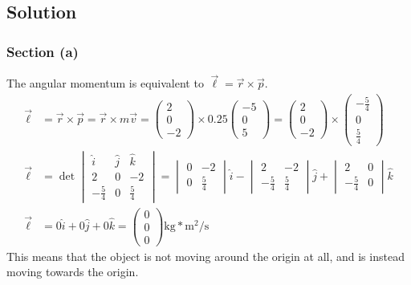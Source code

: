 \documentclass[12pt]{article}
\begin{document}
\subsection{Solution}
\subsubsection{Section (a)}
The angular momentum is equivalent to \(\vec{\ell} = \vec{r}\times\vec{p}\).
\begin{align}
    \vec{\ell}  &=  \vec{r} \times \vec{p}
        =   \vec{r} \times m\vec{v}
        =   \begin{pmatrix}2\\0\\-2\end{pmatrix} \times 0.25\begin{pmatrix}-5\\0\\5\end{pmatrix}
        =   \begin{pmatrix}2\\0\\-2\end{pmatrix} \times \begin{pmatrix}-\frac{5}{4}\\0\\\frac{5}{4}\end{pmatrix}\\
    \vec{\ell}  &=  \det\begin{vmatrix}
                            \hat{i} &\hat{j}&\hat{k}\\
                            2       &0      &-2     \\
                            -\frac{5}{4}&0  &\frac{5}{4}
                        \end{vmatrix}
        =   \begin{vmatrix}0&-2\\0&\frac{5}{4}\end{vmatrix}\hat{i} -
            \begin{vmatrix}2&-2\\-\frac{5}{4}&\frac{5}{4}\end{vmatrix}\hat{j} + 
            \begin{vmatrix}2&0\\-\frac{5}{4}&0\end{vmatrix}\hat{k}\\
    \vec{\ell}  &=  0\hat{i} + 0\hat{j} + 0\hat{k} 
        = \boxed{\begin{pmatrix}0\\0\\0\end{pmatrix}\unit{\kilo\gram*\meter^2/\second}}
\end{align}
This means that the object is not moving around the origin at all, and is instead moving towards the origin. 
\end{document}
